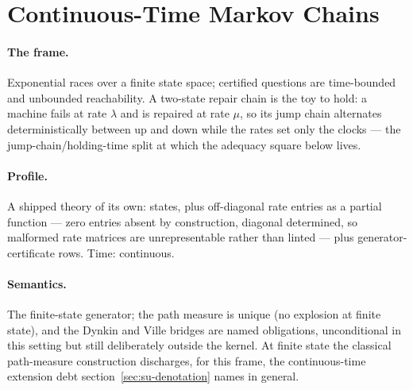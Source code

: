

\section{Continuous-Time Markov Chains}
\label{sec:mt-ctmc}

\paragraph{The frame.} Exponential races over a finite state space;
certified questions are time-bounded and unbounded reachability. A
two-state repair chain is the toy to hold: a machine fails at rate
$\lambda$ and is repaired at rate $\mu$, so its jump chain
alternates deterministically between up and down while the rates set
only the clocks --- the jump-chain/holding-time split at which the
adequacy square below lives.

\paragraph{Profile.} A shipped theory of its own: states, plus
off-diagonal rate entries as a partial function --- zero entries
absent by construction, diagonal determined, so malformed rate
matrices are unrepresentable rather than linted --- plus
generator-certificate rows. Time: continuous.

\paragraph{Semantics.} The finite-state generator; the path measure
is unique (no explosion at finite state), and the Dynkin and Ville
bridges are named obligations, unconditional in this setting but
still deliberately outside the kernel. At finite state the classical
path-measure construction discharges, for this frame, the
continuous-time extension debt section~\ref{sec:su-denotation} names
in general.

